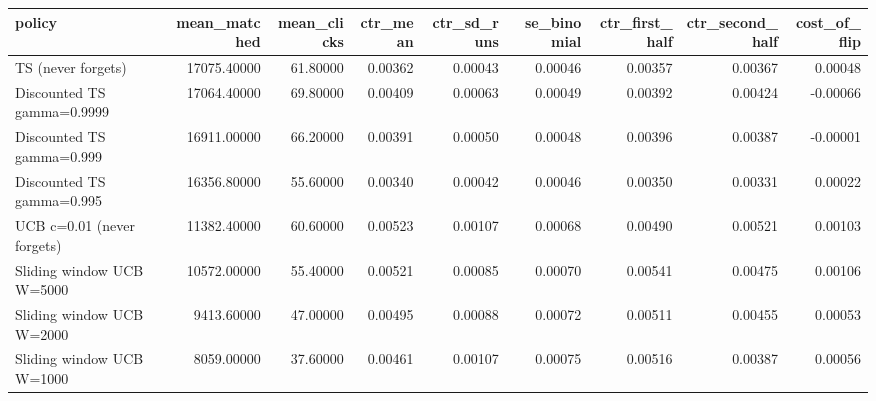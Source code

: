 \begin{tabular}{lrrrrrrrr}
\toprule
policy & mean\_matched & mean\_clicks & ctr\_mean & ctr\_sd\_runs & se\_binomial & ctr\_first\_half & ctr\_second\_half & cost\_of\_flip \\
\midrule
TS (never forgets) & 17075.40000 & 61.80000 & 0.00362 & 0.00043 & 0.00046 & 0.00357 & 0.00367 & 0.00048 \\
Discounted TS gamma=0.9999 & 17064.40000 & 69.80000 & 0.00409 & 0.00063 & 0.00049 & 0.00392 & 0.00424 & -0.00066 \\
Discounted TS gamma=0.999 & 16911.00000 & 66.20000 & 0.00391 & 0.00050 & 0.00048 & 0.00396 & 0.00387 & -0.00001 \\
Discounted TS gamma=0.995 & 16356.80000 & 55.60000 & 0.00340 & 0.00042 & 0.00046 & 0.00350 & 0.00331 & 0.00022 \\
UCB c=0.01 (never forgets) & 11382.40000 & 60.60000 & 0.00523 & 0.00107 & 0.00068 & 0.00490 & 0.00521 & 0.00103 \\
Sliding window UCB W=5000 & 10572.00000 & 55.40000 & 0.00521 & 0.00085 & 0.00070 & 0.00541 & 0.00475 & 0.00106 \\
Sliding window UCB W=2000 & 9413.60000 & 47.00000 & 0.00495 & 0.00088 & 0.00072 & 0.00511 & 0.00455 & 0.00053 \\
Sliding window UCB W=1000 & 8059.00000 & 37.60000 & 0.00461 & 0.00107 & 0.00075 & 0.00516 & 0.00387 & 0.00056 \\
\bottomrule
\end{tabular}

